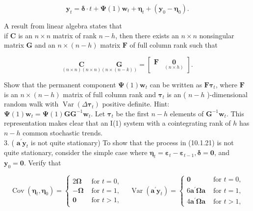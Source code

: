 \documentclass[10pt]{article}
\begin{document}
$$
\mathbf{y}_{t}=\boldsymbol{\delta} \cdot t+\boldsymbol{\Psi}(1) \mathbf{w}_{t}+\boldsymbol{\eta}_{t}+\left(\mathbf{y}_{0}-\boldsymbol{\eta}_{0}\right) .
$$

A result from linear algebra states that\\
if $\mathbf{C}$ is an $n \times n$ matrix of rank $n-h$, then there exists an $n \times n$ nonsingular matrix $\mathbf{G}$ and an $n \times(n-h)$ matrix $\mathbf{F}$ of full column rank such that

$$
\underset{(n \times n)(n \times n)}{\mathbf{C}} \underset{(n \times(n-k))}{\mathbf{G}}=\left[\begin{array}{cc}
\mathbf{F} & \underset{(n \times h)}{\mathbf{0}}
\end{array}\right] .
$$

Show that the permanent component $\boldsymbol{\Psi}(1) \mathbf{w}_{t}$ can be written as $\mathbf{F} \boldsymbol{\tau}_{t}$, where $\mathbf{F}$ is an $n \times(n-h)$ matrix of full column rank and $\boldsymbol{\tau}_{t}$ is an ( $n-h$ )-dimensional\\
random walk with $\operatorname{Var}\left(\Delta \boldsymbol{\tau}_{t}\right)$ positive definite. Hint: $\boldsymbol{\Psi}(1) \mathbf{w}_{t}=\boldsymbol{\Psi}(1) \mathbf{G G}^{-1} \mathbf{w}_{t}$. Let $\boldsymbol{\tau}_{t}$ be the first $n-h$ elements of $\mathbf{G}^{-1} \mathbf{w}_{t}$. This representation makes clear that an I(1) system with a cointegrating rank of $h$ has $n-h$ common stochastic trends.\\
3. ( $\mathbf{a}^{\prime} \mathbf{y}_{t}$ is not quite stationary) To show that the process in (10.1.21) is not quite stationary, consider the simple case where $\boldsymbol{\eta}_{t}=\boldsymbol{\varepsilon}_{t}-\boldsymbol{\varepsilon}_{t-1}, \boldsymbol{\delta}=\mathbf{0}$, and $\mathbf{y}_{0}=\mathbf{0}$. Verify that

$$
\operatorname{Cov}\left(\boldsymbol{\eta}_{t}, \boldsymbol{\eta}_{0}\right)=\left\{\begin{array}{ll}
2 \boldsymbol{\Omega} & \text { for } t=0, \\
-\boldsymbol{\Omega} & \text { for } t=1, \\
\mathbf{0} & \text { for } t>1,
\end{array} \quad \operatorname{Var}\left(\mathbf{a}^{\prime} \mathbf{y}_{t}\right)= \begin{cases}\mathbf{0} & \text { for } t=0, \\
6 \mathbf{a}^{\prime} \boldsymbol{\Omega} \mathbf{a} & \text { for } t=1, \\
4 \mathbf{a}^{\prime} \boldsymbol{\Omega} \mathbf{a} & \text { for } t>1,\end{cases}\right.
$$
\end{document}
